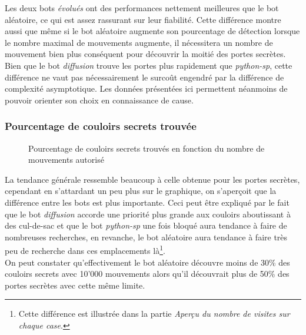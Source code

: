\documentclass[a4paper,12pt]{article}
\begin{document}
Les deux bots {\em évolués} ont des performances nettement meilleures que le bot
aléatoire, ce qui est assez rassurant sur leur fiabilité. Cette différence
montre aussi que même si le bot aléatoire augmente son pourcentage de détection
lorsque le nombre maximal de mouvements augmente, il nécessitera un nombre de
mouvement bien plus conséquent pour découvrir la moitié des portes secrètes.
\\
Bien que le bot {\em diffusion} trouve les portes plus rapidement que
{\em python-sp}, cette différence ne vaut pas nécessairement le surcoût engendré
par la différence de complexité asymptotique. Les données présentées ici
permettent néanmoins de pouvoir orienter son choix en connaissance de cause.

\subsubsection{Pourcentage de couloirs secrets trouvée}

\begin{figure}[H]
  \caption{\label{fig:scorrs_found} Pourcentage de couloirs secrets trouvés en
    fonction du nombre de mouvements autorisé}
\end{figure}

La tendance générale ressemble beaucoup à celle obtenue pour les portes
secrètes, cependant en s'attardant un peu plus sur le graphique, on s'aperçoit
que la différence entre les bots est plus importante. Ceci peut être expliqué
par le fait que le bot {\em diffusion} accorde une priorité plus grande aux
couloirs aboutissant à des cul-de-sac et que le bot {\em python-sp} une fois
bloqué aura tendance à faire de nombreuses recherches,
en revanche, le bot aléatoire aura tendance à faire très peu de recherche dans
ces emplacements là\footnote{Cette différence est illustrée dans la partie
{\em Aperçu du nombre de visites sur chaque case}.}.
\\
On peut constater qu'effectivement le bot aléatoire découvre moins de 30\% des
couloirs secrets avec 10'000 mouvements alors qu'il découvrait plus de 50\% des
portes secrètes avec cette même limite.
\end{document}
